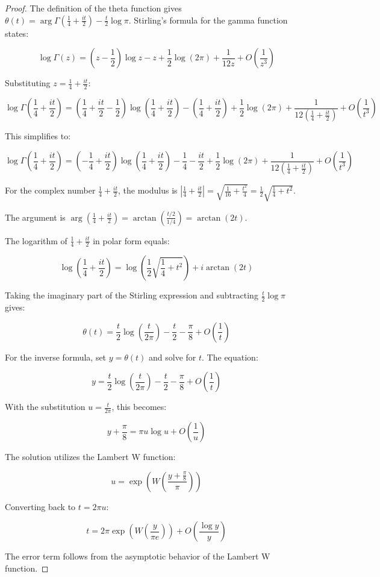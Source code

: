 \documentclass{article}
\begin{document}
\begin{proof}
The definition of the theta function gives $\theta(t) = \arg\Gamma\left(\frac{1}{4}+\frac{it}{2}\right) - \frac{t}{2}\log\pi$. Stirling's formula for the gamma function states:

\[
\log\Gamma(z) = \left(z-\frac{1}{2}\right)\log z - z + \frac{1}{2}\log(2\pi) + \frac{1}{12z} + O\left(\frac{1}{z^3}\right)
\]

Substituting $z = \frac{1}{4}+\frac{it}{2}$:

\[
\log\Gamma\left(\frac{1}{4}+\frac{it}{2}\right) = \left(\frac{1}{4}+\frac{it}{2}-\frac{1}{2}\right)\log\left(\frac{1}{4}+\frac{it}{2}\right) - \left(\frac{1}{4}+\frac{it}{2}\right) + \frac{1}{2}\log(2\pi) + \frac{1}{12\left(\frac{1}{4}+\frac{it}{2}\right)} + O\left(\frac{1}{t^3}\right)
\]

This simplifies to:

\[
\log\Gamma\left(\frac{1}{4}+\frac{it}{2}\right) = \left(-\frac{1}{4}+\frac{it}{2}\right)\log\left(\frac{1}{4}+\frac{it}{2}\right) - \frac{1}{4} - \frac{it}{2} + \frac{1}{2}\log(2\pi) + \frac{1}{12\left(\frac{1}{4}+\frac{it}{2}\right)} + O\left(\frac{1}{t^3}\right)
\]

For the complex number $\frac{1}{4}+\frac{it}{2}$, the modulus is $\left|\frac{1}{4}+\frac{it}{2}\right| = \sqrt{\frac{1}{16}+\frac{t^2}{4}} = \frac{1}{2}\sqrt{\frac{1}{4}+t^2}$.

The argument is $\arg\left(\frac{1}{4}+\frac{it}{2}\right) = \arctan\left(\frac{t/2}{1/4}\right) = \arctan(2t)$.

The logarithm of $\frac{1}{4}+\frac{it}{2}$ in polar form equals:

\[
\log\left(\frac{1}{4}+\frac{it}{2}\right) = \log\left(\frac{1}{2}\sqrt{\frac{1}{4}+t^2}\right) + i\arctan(2t)
\]

Taking the imaginary part of the Stirling expression and subtracting $\frac{t}{2}\log\pi$ gives:

\[
\theta(t) = \frac{t}{2}\log\left(\frac{t}{2\pi}\right) - \frac{t}{2} - \frac{\pi}{8} + O\left(\frac{1}{t}\right)
\]

For the inverse formula, set $y = \theta(t)$ and solve for $t$. The equation:

\[
y = \frac{t}{2}\log\left(\frac{t}{2\pi}\right) - \frac{t}{2} - \frac{\pi}{8} + O\left(\frac{1}{t}\right)
\]

With the substitution $u = \frac{t}{2\pi}$, this becomes:

\[
y + \frac{\pi}{8} = \pi u \log u + O\left(\frac{1}{u}\right)
\]

The solution utilizes the Lambert W function:

\[
u = \exp\left(W\left(\frac{y+\frac{\pi}{8}}{\pi}\right)\right)
\]

Converting back to $t = 2\pi u$:

\[
t = 2\pi\exp\left(W\left(\frac{y}{\pi e}\right)\right) + O\left(\frac{\log y}{y}\right)
\]

The error term follows from the asymptotic behavior of the Lambert W function.
\end{proof}
\end{document}
